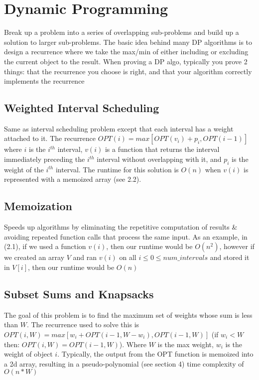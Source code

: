 \documentclass{article}
\begin{document}
\section{Dynamic Programming}
Break up a problem into a series of overlapping sub-problems and build up a solution to larger sub-problems.
The basic idea behind many DP algorithms is to design a recurrence where we take the max/min of either including or excluding the current
object to the result. When proving a DP algo, typically you prove 2 things: that the recurrence you choose is right, and 
that your algorithm correctly implements the recurrence

\subsection{Weighted Interval Scheduling}
Same as interval scheduling problem except that each interval has a weight attached to it. 
The recurrence $OPT(i) = max[OPT(v_i) + p_i, OPT(i - 1)]$ where $i$ is the $i^{th}$ interval, $v(i)$
is a function that returns the interval immediately preceding the $i^{th}$ interval without overlapping with it, 
and $p_i$ is the weight of the $i^{th}$ interval. The runtime for this solution is $O(n)$ when $v(i)$ is 
represented with a memoized array (see 2.2).

\subsection{Memoization}
Speeds up algorithms by eliminating the repetitive computation of results \& avoiding repeated function calls that process the same input.
As an example, in (2.1), if we used a function $v(i)$, then our runtime would be $O(n^2)$, however if we created an array $V$ and ran $v(i)$
on all $i \leq 0 \leq num\_intervals$  and stored it in $V[i]$, then our runtime would be $O(n)$

\subsection{Subset Sums and Knapsacks}
The goal of this problem is to find the maximum set of weights whose sum is less than $W$.
The recurrence used to solve this is $OPT(i, W) = max[w_i + OPT(i - 1, W - w_i), OPT(i-1, W)]$ (if $w_i < W$ then: $OPT(i, W) = OPT(i-1, W)$).
Where $W$ is the max weight, $w_i$ is the weight of object $i$. Typically, the output from the OPT 
function is memoized into a 2d array, resulting in a pseudo-polynomial (see section 4) time complexity of $O(n * W)$
\vspace{10em}
\end{document}
